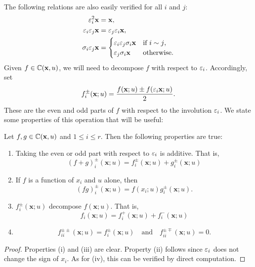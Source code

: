         The following relations are also easily verified for all $i$ and $j$:
        \begin{equation}\label{equ:relations_for_action_of_signs_on_tuples}
            \begin{aligned}
                \varepsilon_{i}^{2}\mathbf{x} &= \mathbf{x}, \\
                \varepsilon_{i}\varepsilon_{j}\mathbf{x} &= \varepsilon_{j}\varepsilon_{i}\mathbf{x}, \\
                \sigma_{i}\varepsilon_{j}\mathbf{x} &= \begin{cases} \varepsilon_{i}\varepsilon_{j}\sigma_{i}\mathbf{x} & \text{if $i \sim j$}, \\ \varepsilon_{j}\sigma_{i}\mathbf{x} & \text{otherwise}. \end{cases}
            \end{aligned}
        \end{equation}
        Given $f \in \mathbb{C}(\mathbf{x},u)$, we will need to decompose $f$ with respect to $\varepsilon_{i}$. Accordingly, set
        \[
            f_{i}^{\pm}(\mathbf{x};u) = \frac{f(\mathbf{x};u) \pm f(\varepsilon_{i}\mathbf{x};u)}{2}.
        \]
        These are the even and odd parts of $f$ with respect to the involution $\varepsilon_{i}$. We state some properties of this operation that will be useful:
        
        \begin{proposition}\label{prop:pm_properties}
            Let $f,g \in \mathbb{C}(\mathbf{x},u)$ and $1 \le i \le r$. Then the following properties are true:
            \begin{enumerate}[label=(\roman*)]
                \item Taking the even or odd part with respect to $\varepsilon_{i}$ is additive. That is,
                \[
                    (f+g)_{i}^{\pm}(\mathbf{x};u) = f_{i}^{\pm}(\mathbf{x};u)+g_{i}^{\pm}(\mathbf{x};u)
                \]
                \item If $f$ is a function of $x_{i}$ and $u$ alone, then
                \[
                    (fg)_{i}^{\pm}(\mathbf{x};u) = f(x_{i};u)g_{i}^{\pm}(\mathbf{x};u).
                \]
                \item $f_{i}^{\pm}(\mathbf{x};u)$ decompose $f(\mathbf{x};u)$. That is,
                \[
                    f_{i}(\mathbf{x};u) = f_{i}^{+}(\mathbf{x};u)+f_{i}^{-}(\mathbf{x};u)
                \]
                \item 
                \[
                    f_{ii}^{\pm\pm}(\mathbf{x};u) = f_{i}^{\pm}(\mathbf{x};u) \quad \text{and} \quad f_{ii}^{\pm\mp}(\mathbf{x};u) = 0.
                \]
            \end{enumerate}
        \end{proposition}
        \begin{proof}
            Properties (i) and (iii) are clear. Property (ii) follows since $\varepsilon_{i}$ does not change the sign of $x_{i}$. As for (iv), this can be verified by direct computation.
        \end{proof}

